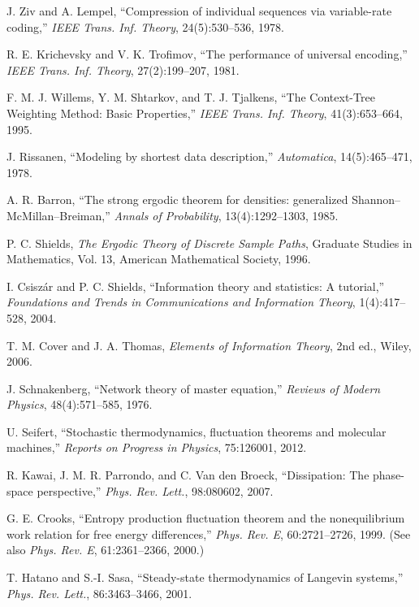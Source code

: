 \documentclass[11pt]{article}
\newcommand{\1}{\mathbbm{1}}
\begin{document}
\begin{thebibliography}{20}

J. Ziv and A. Lempel, ``Compression of individual sequences via variable-rate coding,'' \emph{IEEE Trans. Inf. Theory}, 24(5):530--536, 1978.

R. E. Krichevsky and V. K. Trofimov, ``The performance of universal encoding,'' \emph{IEEE Trans. Inf. Theory}, 27(2):199--207, 1981.

F. M. J. Willems, Y. M. Shtarkov, and T. J. Tjalkens, ``The Context-Tree Weighting Method: Basic Properties,'' \emph{IEEE Trans. Inf. Theory}, 41(3):653--664, 1995.

J. Rissanen, ``Modeling by shortest data description,'' \emph{Automatica}, 14(5):465--471, 1978.

A. R. Barron, ``The strong ergodic theorem for densities: generalized Shannon--McMillan--Breiman,'' \emph{Annals of Probability}, 13(4):1292--1303, 1985.

P. C. Shields, \emph{The Ergodic Theory of Discrete Sample Paths}, Graduate Studies in Mathematics, Vol. 13, American Mathematical Society, 1996.

I. Csisz\'ar and P. C. Shields, ``Information theory and statistics: A tutorial,'' \emph{Foundations and Trends in Communications and Information Theory}, 1(4):417--528, 2004.

T. M. Cover and J. A. Thomas, \emph{Elements of Information Theory}, 2nd ed., Wiley, 2006.

J. Schnakenberg, ``Network theory of master equation,'' \emph{Reviews of Modern Physics}, 48(4):571--585, 1976.

U. Seifert, ``Stochastic thermodynamics, fluctuation theorems and molecular machines,'' \emph{Reports on Progress in Physics}, 75:126001, 2012.

R. Kawai, J. M. R. Parrondo, and C. Van den Broeck, ``Dissipation: The phase-space perspective,'' \emph{Phys. Rev. Lett.}, 98:080602, 2007.

G. E. Crooks, ``Entropy production fluctuation theorem and the nonequilibrium work relation for free energy differences,'' \emph{Phys. Rev. E}, 60:2721--2726, 1999. (See also \emph{Phys. Rev. E}, 61:2361--2366, 2000.)

T. Hatano and S.-I. Sasa, ``Steady-state thermodynamics of Langevin systems,'' \emph{Phys. Rev. Lett.}, 86:3463--3466, 2001.


\end{thebibliography}
\end{document}
